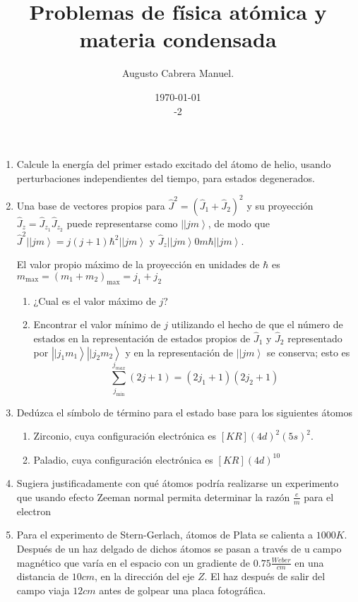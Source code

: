 \documentclass[]{article}
\title{Problemas de física atómica y materia condensada}
\author{Augusto Cabrera Manuel.}
\date{\today\\ \ser 4 \sem 2018-2 }
\begin{document}
\begin{enumerate}
\item Calcule la energía del primer estado excitado del átomo de helio, usando perturbaciones independientes del tiempo, para estados degenerados.
\item Una base  de vectores propios para $\hat{J}^2=\left(\hat{J}_1+\hat{J}_2\right)^2$ y su proyección $\hat{J}_z=\hat{J}_{z_1}\hat{J}_{z_2}$ puede representarse como $\left||jm\right>$, de modo que $\hat{J}^2\left||jm\right>=j\left(j+1\right)\hbar^2\left||jm\right>$ y $\hat{J}_z\left||jm\right>0m\hbar\left||jm\right>$. 

El valor propio máximo de la proyección en unidades de $\hbar$ es $m_{\max}=(m_1+m_2)_{\max}=j_1+j_2$
\begin{enumerate}
\item ¿Cual es el valor máximo de $j$?
\item Encontrar el valor mínimo de $j$ utilizando el hecho de que el número de estados en la representación de estados propios  de $\hat{J}_1$ y $\hat{J}_2$ representado por $\left||j_1m_1\right>\left||j_2m_2\right>$ y en la representación de $\left||jm\right>$ se conserva; esto es 
\begin{equation*}
\sum_{j_{\min}}^{j_{max}}\left(2j+1\right)=(2j_1+1)(2j_2+1)
\end{equation*}
\end{enumerate}
\item Dedúzca el símbolo de término para el estado base para los siguientes átomos
  \begin{enumerate}
  \item Zirconio, cuya configuración electrónica es  $[KR](4d)^2(5s)^2$.
  \item Paladio, cuya configuración electrónica es $[KR](4d)^{10}$
  \end{enumerate}
\item Sugiera justificadamente con qué átomos podría realizarse un experimento que usando efecto Zeeman normal permita determinar la razón $\frac{e}{m}$ para el electron
\item Para el experimento de Stern-Gerlach, átomos de Plata se calienta  a $1000 K$. Después de un haz delgado de dichos átomos  se pasan a través  de u campo magnético que varía en el espacio con un gradiente  de $0.75\frac{Weber}{cm}$ en una distancia de $10 cm$, en la dirección del eje $Z$. El haz después de salir  del campo viaja $12 cm$ antes de golpear una placa fotográfica.

\end{enumerate}
\end{document}
